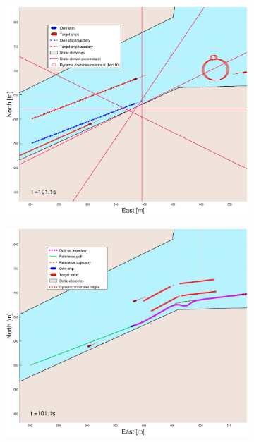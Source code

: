 \begin{figure}[!ht] %
    \begin{subfigure}[b]{0.49\textwidth}
        \centering
        \includegraphics[width=\textwidth]{Images/Figures/Trheimfjord/_Simple_0fig1_time=101}
    \end{subfigure}
    \hfill
    \begin{subfigure}[b]{0.499\textwidth}
        \centering
        \includegraphics[width=\textwidth]{Images/Figures/Trheimfjord/_Simple_0fig999_time=101}

\end{subfigure}
\end{figure}
